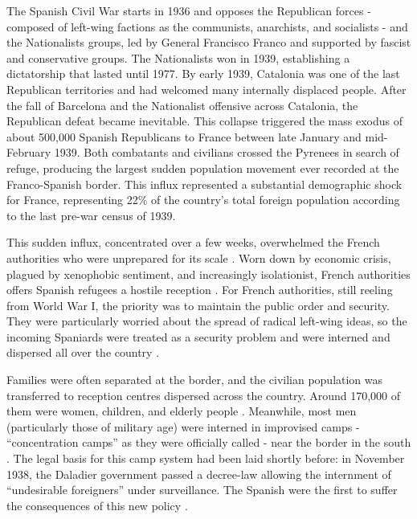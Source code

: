 


The Spanish Civil War starts in 1936 and opposes the Republican forces - composed of left-wing factions as the communists, anarchists, and socialists - and the Nationalists groups, led by General Francisco Franco and supported by fascist and conservative groups. The Nationalists won in 1939, establishing a dictatorship that lasted until 1977. By early 1939, Catalonia was one of the last Republican territories and had welcomed many internally displaced people. After the fall of Barcelona and the Nationalist offensive across Catalonia, the Republican defeat became inevitable. This collapse triggered the mass exodus of about 500,000 Spanish Republicans to France between late January and mid-February 1939. Both combatants and civilians crossed the Pyrenees in search of refuge, producing the largest sudden population movement ever recorded at the Franco-Spanish border. This influx represented a substantial demographic shock for France, representing 22\% of the country’s total foreign population according to the last pre-war census of 1939.


This sudden influx, concentrated over a few weeks, overwhelmed the French authorities who were unprepared for its scale \citep{rafaneau20081939}. Worn down by economic crisis, plagued by xenophobic sentiment, and increasingly isolationist, French authorities offers Spanish refugees a hostile reception \citep{Coignard2012}. For French authorities, still reeling from World War I, the priority was to maintain the public order and security. They were particularly worried about the spread of radical left-wing ideas, so the incoming Spaniards were treated as a security problem and were interned and dispersed all over the country \citep{rafaneau20081939}. 

Families were often separated at the border, and the civilian population was transferred to reception centres dispersed across the country. Around 170,000 of them were women, children, and elderly people \citep{perez_rodriguez_indeseables_2022}. Meanwhile, most men (particularly those of military age) were interned in improvised camps - ``concentration camps” as they were officially called - near the border in the south \citep{DreyfusArmand1999}. The legal basis for this camp system had been laid shortly before: in November 1938, the Daladier government passed a decree-law allowing the internment of “undesirable foreigners” under surveillance. The Spanish were the first to suffer the consequences of this new policy \citep{eurom_argeles-sur-mer_2014}. 

